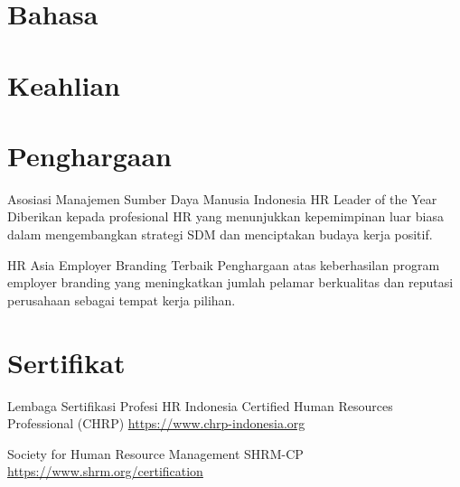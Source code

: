 \documentclass[a4paper, serif, 10pt]{moderncv}
\begin{document}
\section{Bahasa}

\section{Keahlian}

\section{Penghargaan}

        {Asosiasi Manajemen Sumber Daya Manusia Indonesia}
        {HR Leader of the Year}
        {}
        {}
        {Diberikan kepada profesional HR yang menunjukkan kepemimpinan luar biasa dalam mengembangkan strategi SDM dan menciptakan budaya kerja positif.}

        {HR Asia}
        {Employer Branding Terbaik}
        {}
        {}
        {Penghargaan atas keberhasilan program employer branding yang meningkatkan jumlah pelamar berkualitas dan reputasi perusahaan sebagai tempat kerja pilihan.}
\section{Sertifikat}

        {Lembaga Sertifikasi Profesi HR Indonesia}
        {Certified Human Resources Professional (CHRP)}
        {\url{https://www.chrp-indonesia.org}}
        {}
        {}

        {Society for Human Resource Management}
        {SHRM-CP}
        {\url{https://www.shrm.org/certification}}
        {}
        {}
\end{document}
